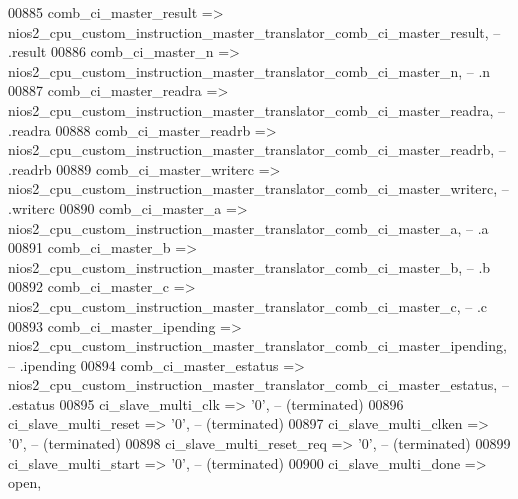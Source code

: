 \begin{DoxyCode}
00885             comb\_ci\_master\_result     => 
      nios2_cpu_custom_instruction_master_translator_comb_ci_master_result,\textcolor{keyword}{   --               .result}
00886             comb\_ci\_master\_n          => 
      nios2_cpu_custom_instruction_master_translator_comb_ci_master_n,\textcolor{keyword}{        --               .n}
00887             comb\_ci\_master\_readra     => 
      nios2_cpu_custom_instruction_master_translator_comb_ci_master_readra,\textcolor{keyword}{   --               .readra}
00888             comb\_ci\_master\_readrb     => 
      nios2_cpu_custom_instruction_master_translator_comb_ci_master_readrb,\textcolor{keyword}{   --               .readrb}
00889             comb\_ci\_master\_writerc    => 
      nios2_cpu_custom_instruction_master_translator_comb_ci_master_writerc,\textcolor{keyword}{  --               .writerc}
00890             comb\_ci\_master\_a          => 
      nios2_cpu_custom_instruction_master_translator_comb_ci_master_a,\textcolor{keyword}{        --               .a}
00891             comb\_ci\_master\_b          => 
      nios2_cpu_custom_instruction_master_translator_comb_ci_master_b,\textcolor{keyword}{        --               .b}
00892             comb\_ci\_master\_c          => 
      nios2_cpu_custom_instruction_master_translator_comb_ci_master_c,\textcolor{keyword}{        --               .c}
00893             comb\_ci\_master\_ipending   => 
      nios2_cpu_custom_instruction_master_translator_comb_ci_master_ipending,\textcolor{keyword}{ --               .ipending}
00894             comb\_ci\_master\_estatus    => 
      nios2_cpu_custom_instruction_master_translator_comb_ci_master_estatus,\textcolor{keyword}{  --               .estatus}
00895             ci\_slave\_multi\_clk        => '0',\textcolor{keyword}{                                                              
            --    (terminated)}
00896             ci\_slave\_multi\_reset      => '0',\textcolor{keyword}{                                                              
            --    (terminated)}
00897             ci\_slave\_multi\_clken      => '0',\textcolor{keyword}{                                                              
            --    (terminated)}
00898             ci\_slave\_multi\_reset\_req  => '0',\textcolor{keyword}{                                                              
            --    (terminated)}
00899             ci\_slave\_multi\_start      => '0',\textcolor{keyword}{                                                              
            --    (terminated)}
00900             ci\_slave\_multi\_done       => \textcolor{keywordflow}{open},\textcolor{keyword}{                                                             
}
\end{DoxyCode}
